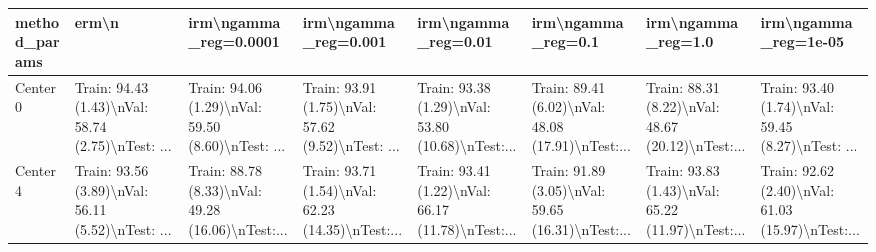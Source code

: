 \begin{tabular}{llllllll}
\toprule
method\_params &                                              erm\textbackslash n &                              irm\textbackslash ngamma\_reg=0.0001 &                               irm\textbackslash ngamma\_reg=0.001 &                                irm\textbackslash ngamma\_reg=0.01 &                                 irm\textbackslash ngamma\_reg=0.1 &                                 irm\textbackslash ngamma\_reg=1.0 &                               irm\textbackslash ngamma\_reg=1e-05 \\
\midrule
Center 0 &  Train: 94.43 (1.43)\textbackslash nVal: 58.74 (2.75)\textbackslash nTest: ... &  Train: 94.06 (1.29)\textbackslash nVal: 59.50 (8.60)\textbackslash nTest: ... &  Train: 93.91 (1.75)\textbackslash nVal: 57.62 (9.52)\textbackslash nTest: ... &  Train: 93.38 (1.29)\textbackslash nVal: 53.80 (10.68)\textbackslash nTest:... &  Train: 89.41 (6.02)\textbackslash nVal: 48.08 (17.91)\textbackslash nTest:... &  Train: 88.31 (8.22)\textbackslash nVal: 48.67 (20.12)\textbackslash nTest:... &  Train: 93.40 (1.74)\textbackslash nVal: 59.45 (8.27)\textbackslash nTest: ... \\
Center 4 &  Train: 93.56 (3.89)\textbackslash nVal: 56.11 (5.52)\textbackslash nTest: ... &  Train: 88.78 (8.33)\textbackslash nVal: 49.28 (16.06)\textbackslash nTest:... &  Train: 93.71 (1.54)\textbackslash nVal: 62.23 (14.35)\textbackslash nTest:... &  Train: 93.41 (1.22)\textbackslash nVal: 66.17 (11.78)\textbackslash nTest:... &  Train: 91.89 (3.05)\textbackslash nVal: 59.65 (16.31)\textbackslash nTest:... &  Train: 93.83 (1.43)\textbackslash nVal: 65.22 (11.97)\textbackslash nTest:... &  Train: 92.62 (2.40)\textbackslash nVal: 61.03 (15.97)\textbackslash nTest:... \\
\bottomrule
\end{tabular}
